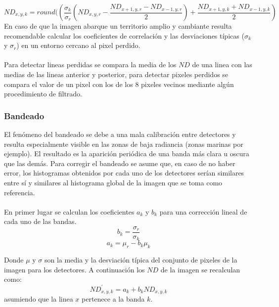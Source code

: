 		\begin{equation}
		ND_{x,y,k} = round((\dfrac{\sigma_{k}}{\sigma_{r}}(ND_{x,y,r}-\dfrac{ND_{x+1,y,r} - ND_{x-1,y,r}}{2}) + \dfrac{ND_{x+1,y,k} + ND_{x-1,y,k}}{2})
		\end{equation} 	
En caso de que la imagen abarque un territorio amplio y cambiante resulta recomendable calcular los coeficientes de correlaci\'on y las desviaciones t\'ipicas ($ \sigma_{k} $ y $ \sigma_{r} $) en un entorno cercano al pixel perdido.\\~\\
Para detectar lineas perdidas se compara la media de los $ ND $ de una linea con las medias de las lineas anterior y posterior, para detectar pixeles perdidos se compara el valor de un pixel con los de los 8 pixeles vecinos mediante alg\'un procedimiento de filtrado.
\subsubsection{Bandeado}\label{subsec:bandeado}
El fen\'omeno del bandeado se debe a una mala calibraci\'on entre detectores y resulta especialmente visible en las zonas de baja radiancia (zonas marinas por ejemplo). El resultado es la aparici\'on peri\'odica de una banda m\'as clara u oscura que las dem\'as.
Para corregir el bandeado se asume que, en caso de no haber error, los histogramas obtenidos por cada uno de los detectores ser\'ian similares entre s\'i y similares al histograma global de la imagen que se toma como referencia.\\~\\
En primer lugar se calculan los coeficientes $ a_{k} $ y $ b_{k} $ para una correcci\'on lineal de cada uno de las bandas.
		\begin{equation}
		b_{k}=\dfrac{\sigma_{r}}{\sigma_{k}}
		\end{equation} 	
				\begin{equation}
				a_{k}=\mu_{r} - b_{k}\mu_{k}
				\end{equation} 	
				
Donde $ \mu $ y $ \sigma $ son la media y la desviaci\'on t\'ipica del conjunto de pixeles de la imagen para los detectores. A continuaci\'on los $ ND $ de la imagen se recalculan como:
				\begin{equation}
				ND_{x,y,k}^{'} = a_{k}+b_{k}ND_{x,y,k}
				\end{equation} 	
asumiendo que la linea $ x $ pertenece a la banda $ k $.				


